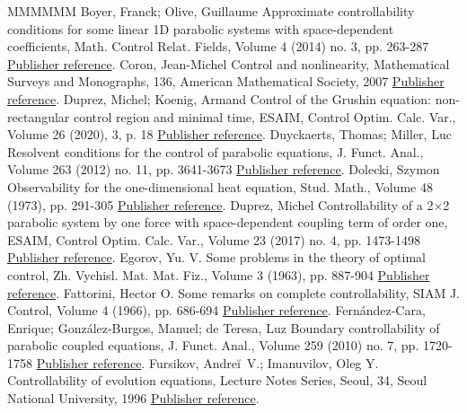 \documentclass[11pt]{article}
\theoremstyle{definition}
\numberwithin{equation}{section}
\numberwithin{figure}{section}
\numberwithin{table}{section}
\begin{document}
\begin{thebibliography}{MMMMMM}
 Boyer, Franck; Olive, Guillaume Approximate controllability conditions for some linear 1D parabolic systems with space-dependent coefficients, Math. Control Relat. Fields, Volume 4 (2014) no. 3, pp. 263-287 \href{https://ahl.centre-mersenne.org/item/AHL_2020__3__717_0/#BoyerOlive14}{Publisher reference}.
 Coron, Jean-Michel Control and nonlinearity, Mathematical Surveys and Monographs, 136, American Mathematical Society, 2007 \href{https://ahl.centre-mersenne.org/item/AHL_2020__3__717_0/#CoronBook}{Publisher reference}.
 Duprez, Michel; Koenig, Armand Control of the Grushin equation: non-rectangular control region and minimal time, ESAIM, Control Optim. Calc. Var., Volume 26 (2020), 3, p. 18 \href{https://ahl.centre-mersenne.org/item/AHL_2020__3__717_0/#DuprezKoenig}{Publisher reference}.
 Duyckaerts, Thomas; Miller, Luc Resolvent conditions for the control of parabolic equations, J. Funct. Anal., Volume 263 (2012) no. 11, pp. 3641-3673 \href{https://ahl.centre-mersenne.org/item/AHL_2020__3__717_0/#DuyckaertsMiller12}{Publisher reference}.
 Dolecki, Szymon Observability for the one-dimensional heat equation, Stud. Math., Volume 48 (1973), pp. 291-305 \href{https://ahl.centre-mersenne.org/item/AHL_2020__3__717_0/#Dolecki73}{Publisher reference}.
 Duprez, Michel Controllability of a 2×2 parabolic system by one force with space-dependent coupling term of order one, ESAIM, Control Optim. Calc. Var., Volume 23 (2017) no. 4, pp. 1473-1498 \href{https://ahl.centre-mersenne.org/item/AHL_2020__3__717_0/#Duprez_Tmin2017}{Publisher reference}.
 Egorov, Yu. V. Some problems in the theory of optimal control, Zh. Vychisl. Mat. Mat. Fiz., Volume 3 (1963), pp. 887-904 \href{https://ahl.centre-mersenne.org/item/AHL_2020__3__717_0/#Egorov63}{Publisher reference}.
 Fattorini, Hector O. Some remarks on complete controllability, SIAM J. Control, Volume 4 (1966), pp. 686-694 \href{https://ahl.centre-mersenne.org/item/AHL_2020__3__717_0/#Fattorini66}{Publisher reference}.
 Fernández-Cara, Enrique; González-Burgos, Manuel; de Teresa, Luz Boundary controllability of parabolic coupled equations, J. Funct. Anal., Volume 259 (2010) no. 7, pp. 1720-1758 \href{https://ahl.centre-mersenne.org/item/AHL_2020__3__717_0/#FCGBdT:2010}{Publisher reference}.
 Fursikov, Andreĭ V.; Imanuvilov, Oleg Y. Controllability of evolution equations, Lecture Notes Series, Seoul, 34, Seoul National University, 1996 \href{https://ahl.centre-mersenne.org/item/AHL_2020__3__717_0/#FursikovImanuvilov96}{Publisher reference}.

\end{thebibliography}
\end{document}
